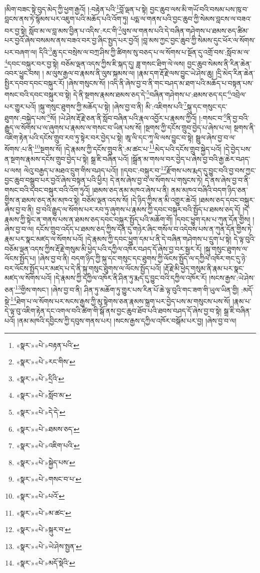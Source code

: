 །མིག་བཟང་སྟེ་བུད་མེད་ཀྱི་ཕྱག་རྒྱའོ། །:བརྟེན་པའི་\footnote{«སྣར་»«པེ་»བརྟན་པའི་}བློ་ལྡན་པ་སྟེ། བྱང་ཆུབ་ལས་མི་གཡོ་བའི་བསམ་པས་ཁུ་བ་བླངས་ནས་ཏེ་སྙོམས་པར་འཇུག་པའི་མཆོད་པའི་འོག་ཏུ། པདྨ་ལ་གནས་པའི་བྱང་ཆུབ་ཀྱི་སེམས་བླངས་ལ་བཟའ་བར་བྱ་སྟེ། སློབ་མ་ལ་བླ་མས་བྱིན་པ་འདིས་:རང་གི་\footnote{«སྣར་»«པེ་»རང་གིས་}ལུས་ལ་གནས་པའི་དེ་བཞིན་གཤེགས་པ་ཐམས་ཅད་ཚིམ་པར་བྱའོ་ཞེས་བསམས་ནས་བཟའ་བར་བྱ་ཞིང་སྤྱད་པར་བྱའོ། །བླ་མས་ཀྱང་བྱང་ཆུབ་ཀྱི་སེམས་དུང་ཕོར་ལ་སོགས་པར་བཞག་ལ། དིའི་\footnote{«སྣར་»«པེ་»དྲིའི་}ཆུ་དང་བསྲེས་ལ་བཀྲ་ཤིས་ཀྱི་ཚིགས་སུ་བཅད་པ་ལ་སོགས་པ་སྔོན་དུ་འགྲོ་བས་:སློབ་མ་ལ་\footnote{«སྣར་»«པེ་»སློབ་མ་}དབང་བསྐུར་བར་བྱ་སྟེ། བཅོམ་ལྡན་འདས་ཀྱིས་ཇི་སྐད་དུ། ཟླ་གསང་ཐིག་ལེ་ལས། བྱང་ཆུབ་སེམས་ནི་རིན་ཆེན་འབར་ཕྱུང་བས། །
མ་ལུས་རྒྱལ་བ་རྣམས་ནི་ལུས་སྐམས་ལ། །རྣམ་དག་རྡོ་རྗེ་ལས་བྱུང་ཡེ་ཤེས་ཆུ། །དྲི་མེད་རིན་ཆེན་སྤྱིར་དབབ་དབང་བསྐུར་རོ། །ཞེས་གསུངས་སོ། །འདི་ནི་ཞེས་བྱ་བ་ནི་གང་བཤད་མ་ཐག་པའི་མཆོད་པ་བསྟན་པས་གསང་བའི་དབང་བསྐུར་བ་སྟེ། དེ་ནི་སྔགས་རྣམས་ཐམས་ཅད་དེ་\footnote{«སྣར་»«པེ་»དེ་དེ་}བཞིན་གཤེགས་པ་:ཐམས་ཅད་དང་\footnote{«སྣར་»«པེ་»ཐམས་ཅད་}འབྲེལ་པར་གྱུར་པའོ། །སྐུ་གསུང་ཐུགས་ཀྱི་མཆོད་པ་སྟེ། །ཞེས་བྱ་བ་ནི། མི་:འཇིགས་པའི་\footnote{«སྣར་»«པེ་»འཇིག་པའི་}སྐུ་དང་གསུང་དང་ཐུགས་:བསྐྱེད་པས་\footnote{«སྣར་»«པེ་»སྐྱེད་པས་}སོ། །ཡེ་ཤེས་རྡོ་རྗེ་ཅན་ནི་སློབ་བཞིན་པའི་རྣལ་འབྱོར་པ་རྣམས་ཀྱིའོ། །:གསང་བ་\footnote{«སྣར་»«པེ་»གསང་བ་པ་}ནི་བྱ་བའི་རྒྱུད་ལ་སོགས་པ་ལ་ཞུགས་པ་རྣམས་ལ་གསང་བ་ཡིན་པས་སོ། །སྔགས་ཀྱི་དངོས་གྲུབ་བྱེད་པ་ཞེས་པ་ལ། སྔགས་ནི་འཇིག་རྟེན་པའི་དངོས་གྲུབ་རབ་ཏུ་སྟེར་བར་བྱེད་པ་སྟེ། ཨཱ་ལི་དང་ཀཱ་ལི་ལས་བྱུང་བ་སྟེ། སྦྲུལ་ཞེས་བྱ་བ་ལ་སོགས་:པ་ནི་\footnote{«སྣར་»«པེ་»པའོ་}སྔགས་སོ། །དེ་རྣམས་ཀྱི་དངོས་གྲུབ་ནི་:མ་ཚང་པ་\footnote{«སྣར་»«པེ་»མ་ཚང་}མེད་པའི་དངོས་གྲུབ་སྐྱེད་པའོ། །དེ་བྱེད་པས་ན་སྔགས་རྣམས་དངོས་གྲུབ་བྱེད་པ་སྟེ། སྒྲ་ཇི་བཞིན་པའོ། །སྒྲོན་མ་གསལ་བར་བྱེད་པ་ཞེས་བྱ་བའི་རྒྱ་ཆེར་བཤད་པ་ལས། ལེའུ་བརྒྱད་པ་མཐའ་དྲུག་གིས་བཤད་པའོ།། །།དབང་:བསྐུར་བ་\footnote{«སྣར་»«པེ་»སྐུར་བ་}རྫོགས་པས་རྨད་དུ་བྱུང་བའི་བྱ་བས་ཀྱང་བྱང་ཆུབ་བསྒྲུབ་པར་བྱའོ་ཞེས་བསྟན་པའི་ཕྱིར། དེ་ནས་ཞེས་བྱ་བ་ལ་སོགས་པ་གསུངས་ཏེ། དེ་ནས་ཞེས་བྱ་བ་ནི་གསང་བའི་དབང་བསྐུར་བའི་འོག་ཏུའོ། །ཐམས་ཅད་ནམ་མཁའ་ཞེས་པ་ནི། ནམ་མཁའ་བཞིའི་བདག་ཉིད་ཅན་གྱིས་ན་ཐམས་ཅད་ནམ་མཁའ་སྟེ། བཅོམ་ལྡན་འདས་སོ། །དེ་ཉིད་ཀྱིས་ན་མི་འགྱུར་ཆེའོ། །ཐམས་ཅད་དབང་བསྐུར་ཞེས་བྱ་བ་ནི། བྱ་བའི་རྒྱུད་ལ་སོགས་པར་རབ་ཏུ་ཞུགས་པ་རྣམས་ཀྱི་དབང་བསྐུར་བའི་སྤྱོད་པ་ཐམས་ཅད་དོ། །དེ་རྣམས་ཀྱི་སྟེང་ན་གནས་པས་ན་ཐམས་ཅད་དབང་བསྐུར་སྤྱོད་པའི་མཆོག་གོ། །དབང་ཕྱུག་དམ་པ་ཀུན་དོན་གྱིས། །ཞེས་བྱ་བ་ལ། དངོས་གྲུབ་འདོད་པ་ཐམས་ཅད་ཀྱིས་དོན་དུ་གཉེར་ཞིང་གསོལ་བ་འདེབས་པས་ན་ཀུན་དོན་གྱིས་ཏེ་རྣམ་པར་སྣང་མཛད་ལ་སོགས་པའོ། །དེ་རྣམས་ཀྱི་དབང་ཕྱུག་དམ་པ་ནི་དེ་བཞིན་གཤེགས་པ་དྲུག་པ་སྟེ། དེ་ལྟ་བུའི་བཅོམ་ལྡན་འདས་ཀྱིས་རྡོ་རྗེ་གསུམ་མི་ཕྱེད་པའི་དཀྱིལ་འཁོར་བཤད་དོ་ཞེས་བྱ་བར་སྦྱར་རོ། །སྐུ་གསུང་ཐུགས་ལ་ལོངས་སྤྱོད་པ། །ཞེས་བྱ་བ་ནི། བདག་ཉིད་ཀྱི་སྐུ་དང་གསུང་དང་ཐུགས་ཀྱི་ལོངས་སྤྱོད་ལ་དཀྱིལ་འཁོར་གང་དུ་ཉེ་བར་ལོངས་སྤྱོད་པར་མཛད་པ་དེ་ནི་སྐུ་གསུང་ཐུགས་ལ་ལོངས་སྤྱོད་པའོ། །རྡོ་རྗེ་མི་ཕྱེད་གསུམ་ནི་རྣམ་པར་སྣང་མཛད་ལ་སོགས་པའོ། །དེ་རྣམས་ཀྱི་དཀྱིལ་འཁོར་ནི་ཤིན་ཏུ་རྨད་དུ་བྱུང་བའི་དཀྱིལ་འཁོར་རོ། །སངས་རྒྱས་:ཡེ་ཤེས་ཅན་\footnote{«སྣར་»«པེ་»ཡེ་ཤེས་སྤྱན་}གྱིས་གསང་། །ཞེས་བྱ་བ་ནི། ཤིན་ཏུ་མཆོག་ཏུ་གྱུར་པས་རིན་པོ་ཆེ་ལྟ་བུའི་གང་ཟག་གི་ཡུལ་ཡིན་གྱི། :མདོ་སྡེ་\footnote{«སྣར་»«པེ་»མདོ་སྡེའི་}ཐེག་པ་ལ་སོགས་པར་སངས་རྒྱས་ཀྱི་མུ་སྟེགས་ཅན་རྣམས་སྐྲག་པར་བྱེད་པས་མ་གསུངས་པས་སོ། །རྣམ་པ་དེ་ལྟ་བུ་འཇིག་རྟེན་དང་འགལ་བའི་ཚིག་གི་སྒོ་ནས་བྱང་ཆུབ་ཐོབ་པའི་ཐབས་བཤད་དོ་ཞེས་བྱ་བ་སྟེ། སྒྲ་ཇི་བཞིན་པའོ། །ནམ་མཁའི་དབྱིངས་ཀྱི་དབུས་གནས་པར། །སངས་རྒྱས་དཀྱིལ་འཁོར་བསྒོམ་པར་བྱ། །ཞེས་བྱ་བ་ལ། 